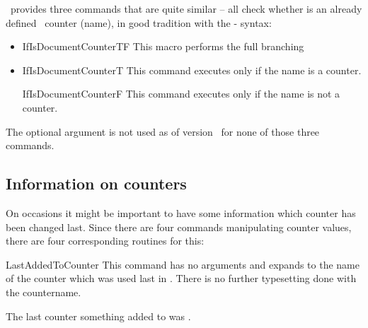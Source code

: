 \documentclass[12pt,a4paper,oneside]{article}
\makeatletter
\newcommand{\chdocextractversion}[1]{%
  \@nameuse{#1}%
}
\renewcommand{\tcbdocupdated}[1]{#1}%
\newcommand{\CHDocUpdate}[1]{\tcbdocmarginnote[doclang/updated={},colback={yellow},colframe={yellow!50!red},  fontupper={\tiny}
]{%
  \tcbdocupdated{\chdocextractversion{xassoccntversion#1}}%
}%
}
\newcommand{\CHDocExpCommand}[1][Expandable]{%
  \tcbdocmarginnote[doclang/new={N},
  colframe=green!50!blue,
  halign=left,
  colback={green!90!blue},
  fontupper={\tiny}
  ]{%
    #1%
  }%
}
\newcommand{\PackageDocName}{xassoccnt}%
\def\packageversion{\xassoccntpackageversion}%
\makeatother
\begin{document}
\CHDocPackage{\PackageDocName}\ provides three commands that are quite similar -- all check whether  is an already defined \LaTeXe\ counter (name), in good tradition with the  - syntax:

\begin{itemize}
\item \begin{docCommand}{IfIsDocumentCounterTF}{\oarg{}}
This macro performs the full branching 
\end{docCommand}
\item 

\begin{docCommand}{IfIsDocumentCounterT}{\oarg{}}
This command executes only if the name is a counter. 
\end{docCommand}

\begin{docCommand}{IfIsDocumentCounterF}{\oarg{}}
This command executes only if the name is not a counter. 
\end{docCommand}

\end{itemize}

The optional argument is not used as of version \packageversion\ for none of those three commands. 


\subsection[Information macros]{Information on counters} \label{subsection::informationcmds}

On occasions it might be important to have some information which counter has been changed last. Since there are four commands manipulating counter values, there are four corresponding routines for this:

\begin{docCommand}[before={\CHDocExpCommand\par\CHDocUpdate{1.3}}]{LastAddedToCounter}{}
This command has no arguments and expands to the name of the counter which was used last in . There is no further typesetting done with the countername. 

\begin{dispExample}
  
  \addtocounter{SomeCounter}{10}

  The last counter something added to was \LastAddedToCounter.
\end{dispExample}%
\end{docCommand}%
\end{document}
